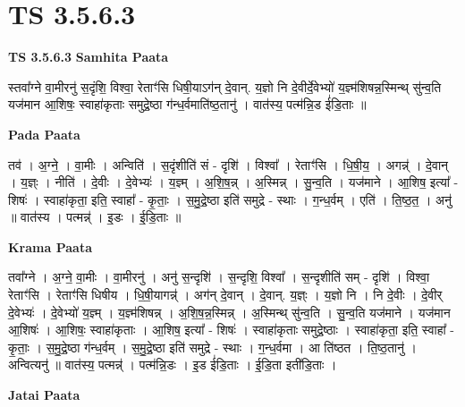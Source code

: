 \documentclass[17pt]{extarticle}
\begin{document}
\section{ TS 3.5.6.3 }

\textbf{TS 3.5.6.3 } \newline
\textbf{Samhita Paata} \newline

स्तवा᳚ग्ने वा॒मीरनु॑ स॒दृंशि॒ विश्वा॒ रेताꣳ॑सि धिषी॒याऽग॑न् दे॒वान्. य॒ज्ञो नि दे॒वीर्दे॒वेभ्यो॑ य॒ज्ञ्म॑शिषन्न॒स्मिन्थ् सु॑न्व॒ति यज॑मान आ॒शिषः॒ स्वाहा॑कृताः समुद्रे॒ष्ठा ग॑न्ध॒र्वमाति॑ष्ठ॒तानु॑ । वात॑स्य॒ पत्म॑न्नि॒ड ई॑डि॒ताः ॥ \newline

\textbf{Pada Paata} \newline

तव॑ । अ॒ग्ने॒ । वा॒मीः । अन्विति॑ । स॒दृंशीति॑ सं - दृशि॑ । विश्वा᳚ । रेताꣳ॑सि । धि॒षी॒य॒ । अगन्न्॑ । दे॒वान् । य॒ज्ञ्ः । नीति॑ । दे॒वीः । दे॒वेभ्यः॑ । य॒ज्ञ्म् । अ॒शि॒ष॒न्न् । अ॒स्मिन्न् । सु॒न्व॒ति । यज॑माने । आ॒शिष॒ इत्या᳚ - शिषः॑ । स्वाहा॑कृता॒ इति॒ स्वाहा᳚ - कृ॒ताः॒ । स॒मु॒द्रे॒ष्ठा इति॑ समुद्रे - स्थाः । ग॒न्ध॒र्वम् । एति॑ । ति॒ष्ठ॒त॒ । अनु॑ ॥ वात॑स्य । पत्मन्न्॑ । इ॒डः । ई॒डि॒ताः ॥  \newline


\textbf{Krama Paata} \newline

तवा᳚ग्ने । अ॒ग्ने॒ वा॒मीः । वा॒मीरनु॑ । अनु॑ स॒न्दृशि॑ । स॒न्दृशि॒ विश्वा᳚ । स॒न्दृशीति॑ सम् - दृशि॑ । विश्वा॒ रेताꣳ॑सि । रेताꣳ॑सि धिषीय । धि॒षी॒यागन्न्॑ । अग॑न् दे॒वान् । दे॒वान्. य॒ज्ञ्ः । य॒ज्ञो नि । नि दे॒वीः । दे॒वीर् दे॒वेभ्यः॑ । दे॒वेभ्यो॑ य॒ज्ञ्म् । य॒ज्ञ्म॑शिषन्न् । अ॒शि॒ष॒न्न॒स्मिन्न् । अ॒स्मिन्थ् सु॑न्व॒ति । सु॒न्व॒ति यज॑माने । यज॑मान आ॒शिषः॑ । आ॒शिषः॒ स्वाहा॑कृताः । आ॒शिष॒ इत्या᳚ - शिषः॑ । स्वाहा॑कृताः समुद्रे॒ष्ठाः । स्वाहा॑कृता॒ इति॒ स्वाहा᳚ - कृ॒ताः॒ । स॒मु॒द्रे॒ष्ठा ग॑न्ध॒र्वम् । स॒मु॒द्रे॒ष्ठा इति॑ समुद्रे - स्थाः । ग॒न्ध॒र्वमा । आ ति॑ष्ठत । ति॒ष्ठ॒तानु॑ । अन्वित्यनु॑ ॥ वात॑स्य॒ पत्मन्न्॑ । पत्म॑न्नि॒डः । इ॒ड ई॑डि॒ताः । ई॒डि॒ता इती॑डि॒ताः । \newline

\textbf{Jatai Paata} \newline
\end{document}
